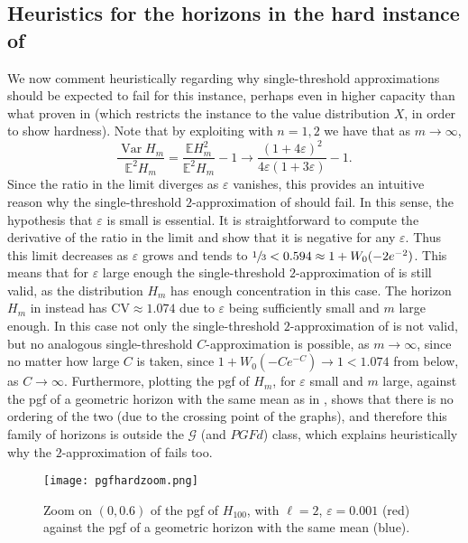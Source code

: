 \documentclass[11pt, a4paper, twoside]{article}
\newcommand{\eps}{\varepsilon}
\newcommand{\EE}{\mathbb{E}}
\newcommand{\PGF}{\mathcal{G}}
\DeclareMathOperator{\Var}{Var}
\numberwithin{equation}{section}
\begin{document}
    \subsection{Heuristics for the horizons in the hard instance of }\label{supphardsecretaryheur}
    We now comment heuristically regarding why single-threshold approximations should be expected to fail for this instance, perhaps even in higher capacity than what proven in  (which restricts the instance to the value distribution $X$, in order to show hardness). Note that by exploiting  with $n=1,2$ we have that as $m\longrightarrow\infty$,
	\[\frac{\Var H_m}{\EE^2 H_m}=\frac{\EE H_m^2}{\EE^2 H_m}-1\longrightarrow\frac{(1+4\eps)^2}{4\eps(1+3\eps)}-1.\] Since the ratio in the limit diverges as $\eps$ vanishes, this provides an intuitive reason why the single-threshold $2$-approximation of  should fail. In this sense, the hypothesis that $\eps$ is small is essential. It is straightforward to compute the derivative of the ratio in the limit and show that it is negative for any $\eps$. Thus this limit decreases as $\eps$ grows and tends to $\sfrac{1}{3}<0.594\approx1+W_0(-2e^{-2})$. This means that for $\eps$ large enough the single-threshold $2$-approximation of  is still valid, as the distribution $H_m$ has enough concentration in this case. The horizon $H_m$ in  instead has $\text{CV}\approx1.074$ due to $\eps$ being sufficiently small and $m$ large enough. In this case not only the single-threshold $2$-approximation of  is not valid, but no analogous single-threshold $C$-approximation is possible, as $m\longrightarrow\infty$, since no matter how large $C$ is taken, since $1+W_0(-Ce^{-C})\longrightarrow 1<1.074$ from below, as $C\longrightarrow\infty$. Furthermore, plotting the pgf of $H_m$, for $\eps$ small and $m$ large, against the pgf of a geometric horizon with the same mean as in , shows that there is no ordering of the two (due to the crossing point of the graphs), and therefore this family of horizons is outside the $\PGF$ (and $PGFd$) class, which explains heuristically why the $2$-approximation of  fails too.
	\begin{figure}\centering
		\texttt{[image: pgfhardzoom.png]}
		\caption{Zoom on $(0,0.6)$ of the pgf of $H_{100}$, with $\ell=2$, $\eps=0.001$ (red) against the pgf of a geometric horizon with the same mean (blue).}
		\label{pgfzoom}
	\end{figure}
\end{document}
